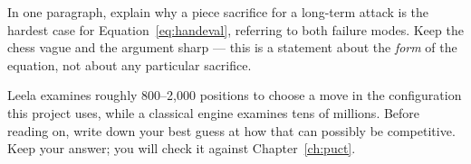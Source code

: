 \begin{exercises}
 In one paragraph, explain why a piece sacrifice for a
long-term attack is the hardest case for Equation~\eqref{eq:handeval}, referring to both
failure modes. Keep the chess vague and the argument sharp --- this is a statement about the
\emph{form} of the equation, not about any particular sacrifice.

 Leela examines roughly 800--2{,}000 positions to choose a move in the
configuration this project uses, while a classical engine examines tens of millions. Before
reading on, write down your best guess at how that can possibly be competitive. Keep your
answer; you will check it against Chapter~\ref{ch:puct}.

\end{exercises}
